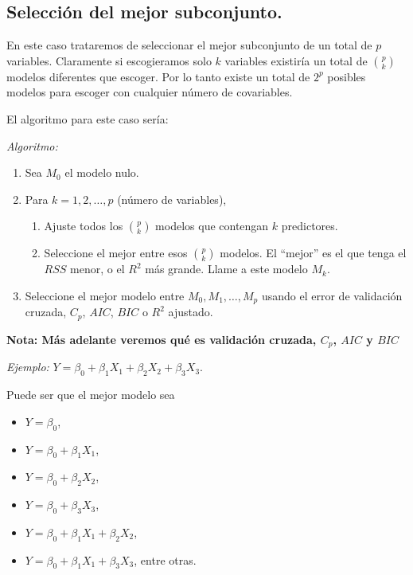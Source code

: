 \documentclass[
  12pt,
]{book}
\providecommand{\tightlist}{%
  \setlength{\itemsep}{0pt}\setlength{\parskip}{0pt}}
\theoremstyle{definition}
\theoremstyle{definition}
\theoremstyle{definition}
\theoremstyle{definition}
\theoremstyle{remark}
\begin{document}
\hypertarget{selecciuxf3n-del-mejor-subconjunto.}{%
\subsection{Selección del mejor subconjunto.}\label{selecciuxf3n-del-mejor-subconjunto.}}

En este caso trataremos de seleccionar el mejor subconjunto de un total de \(p\) variables. Claramente si escogieramos solo \(k\) variables existiría un total de \(\binom{p}{k}\) modelos diferentes que escoger. Por lo tanto existe un total de \(2^p\) posibles modelos para escoger con cualquier número de covariables.

El algoritmo para este caso sería:

\emph{Algoritmo:}

\begin{enumerate}
\def\labelenumi{\arabic{enumi}.}
\item
  Sea \(M_0\) el modelo nulo.
\item
  Para \(k=1,2,\dots,p\) (número de variables),

  \begin{enumerate}
  \def\labelenumii{\alph{enumii}.}
  \tightlist
  \item
    Ajuste todos los \(\binom{p}{k}\) modelos que contengan \(k\) predictores.
  \item
    Seleccione el mejor entre esos \(\binom{p}{k}\) modelos. El ``mejor'' es el que tenga el \(RSS\) menor, o el \(R^2\) más grande. Llame a este modelo \(M_k\).
  \end{enumerate}
\item
  Seleccione el mejor modelo entre \(M_0,M_1,\dots,M_p\) usando el error de validación cruzada, \(C_p\), \(AIC\), \(BIC\) o \(R^2\) ajustado.
\end{enumerate}

\textbf{Nota: Más adelante veremos qué es validación cruzada, \(C_p\), \(AIC\) y \(BIC\)}

\emph{Ejemplo:} \(Y = \beta_0+\beta_1X_1+ \beta_2X_2 + \beta_3X_3\).

Puede ser que el mejor modelo sea

\begin{itemize}
\item
  \(Y = \beta_0\),
\item
  \(Y = \beta_0+\beta_1X_1\),
\item
  \(Y = \beta_0+\beta_2X_2\),
\item
  \(Y = \beta_0+\beta_3X_3\),
\item
  \(Y = \beta_0+\beta_1X_1+\beta_2X_2\),
\item
  \(Y = \beta_0+\beta_1X_1+\beta_3X_3\), entre otras.
\end{itemize}
\end{document}
